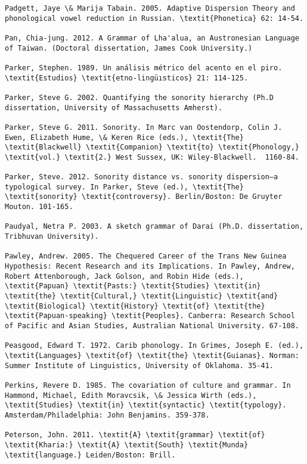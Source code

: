 \begin{verbatim}
Padgett, Jaye \& Marija Tabain. 2005. Adaptive Dispersion Theory and phonological vowel reduction in Russian. \textit{Phonetica} 62: 14-54.

Pan, Chia-jung. 2012. A Grammar of Lha'alua, an Austronesian Language of Taiwan. (Doctoral dissertation, James Cook University.)

Parker, Stephen. 1989. Un análisis métrico del acento en el piro. \textit{Estudios} \textit{etno-lingüısticos} 21: 114-125.

Parker, Steve G. 2002. Quantifying the sonority hierarchy (Ph.D dissertation, University of Massachusetts Amherst). 

Parker, Steve G. 2011. Sonority. In Marc van Oostendorp, Colin J. Ewen, Elizabeth Hume, \& Keren Rice (eds.), \textit{The} \textit{Blackwell} \textit{Companion} \textit{to} \textit{Phonology,} \textit{vol.} \textit{2.} West Sussex, UK: Wiley-Blackwell.  1160-84.

Parker, Steve. 2012. Sonority distance vs. sonority dispersion–a typological survey. In Parker, Steve (ed.), \textit{The} \textit{sonority} \textit{controversy}. Berlin/Boston: De Gruyter Mouton. 101-165.

Paudyal, Netra P. 2003. A sketch grammar of Darai (Ph.D. dissertation, Tribhuvan University).

Pawley, Andrew. 2005. The Chequered Career of the Trans New Guinea Hypothesis: Recent Research and its Implications. In Pawley, Andrew, Robert Attenborough, Jack Golson, and Robin Hide (eds.), \textit{Papuan} \textit{Pasts:} \textit{Studies} \textit{in} \textit{the} \textit{Cultural,} \textit{Linguistic} \textit{and} \textit{Biological} \textit{History} \textit{of} \textit{the} \textit{Papuan-speaking} \textit{Peoples}. Canberra: Research School of Pacific and Asian Studies, Australian National University. 67-108.

Peasgood, Edward T. 1972. Carib phonology. In Grimes, Joseph E. (ed.), \textit{Languages} \textit{of} \textit{the} \textit{Guianas}. Norman: Summer Institute of Linguistics, University of Oklahoma. 35-41.

Perkins, Revere D. 1985. The covariation of culture and grammar. In Hammond, Michael, Edith Moravcsik, \& Jessica Wirth (eds.), \textit{Studies} \textit{in} \textit{syntactic} \textit{typology}. Amsterdam/Philadelphia: John Benjamins. 359-378.

Peterson, John. 2011. \textit{A} \textit{grammar} \textit{of} \textit{Kharia:} \textit{A} \textit{South} \textit{Munda} \textit{language.} Leiden/Boston: Brill.


\end{verbatim}
